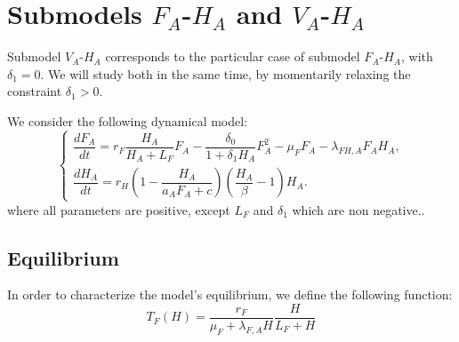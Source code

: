 \documentclass{article}
\newcommand{\lfa}{\lambda_{F, A}}
\begin{document}
\section{Submodels $F_A$-$H_A$ and $V_A$-$H_A$}
Submodel $V_A$-$H_A$ corresponds to the particular case of submodel $F_A$-$H_A$, with $\delta_1 = 0$. We will study both in the same time, by momentarily relaxing the constraint $\delta_1 > 0$.

We consider the following dynamical model:
\begin{equation}
\left\{ \begin{array}{l}
\dfrac{dF_{A}}{dt}=r_F  \dfrac{H_A}{H_A+L_F}F_A - \dfrac{\delta_0}{1 +\delta_1 H_A}F_A^2-\mu_{F}F_A-\lambda_{FH,A}F_AH_A,\\
\dfrac{dH_A}{dt}=r_{H}\left(1-\dfrac{H_A}{a_{A}F_{A}+c}\right)\left(\dfrac{H_A}{\beta}-1\right)H_A.
\end{array}\right.
\label{submodelAnthropoFH}
\end{equation}
where all parameters are positive, except $L_F$ and $\delta_1$ which are non negative.. 

\subsection{Equilibrium}
In order to characterize the model's equilibrium, we define the following function:
\begin{equation*}
T_F(H) = \dfrac{r_F}{\mu_F + \lfa H} \dfrac{H}{L_F + H}
\end{equation*}
\end{document}
